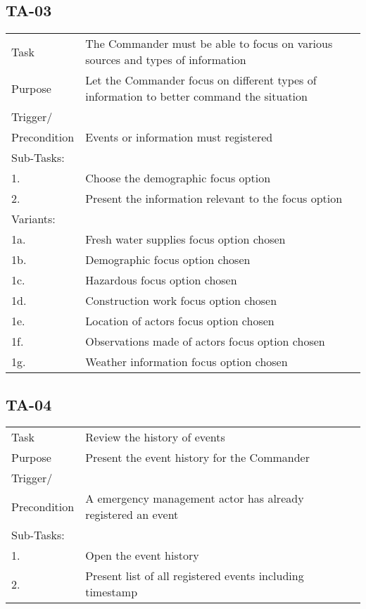 \FloatBarrier
\newpage

\subsection{TA-03}
\begin{longtable}{| p{2.5cm}  | p{10cm} |  }
	\hline
	Task & The Commander must be able to focus on various sources and types of information  \\
	Purpose & Let the Commander focus on different types of information to better command the situation \\
	Trigger/ &  \\ Precondition & Events or information must registered \\
	\hline
	Sub-Tasks: & \\
	1. & Choose the demographic focus option \\
	2. & Present the information relevant to the focus option \\
	\hline
	Variants: & \\
	1a. & Fresh water supplies focus option chosen \\
	1b. & Demographic focus option chosen \\
	1c. & Hazardous focus option chosen \\
	1d. & Construction work focus option chosen \\
	1e. & Location of actors focus option chosen \\
	1f. & Observations made of actors focus option chosen \\
	1g. & Weather information focus option chosen \\
	\hline
\end{longtable}

\subsection{TA-04}

\begin{longtable}{| p{2.5cm}  | p{10cm} |  }
	\hline
	Task & Review the history of events \\
	Purpose & Present the event history for the Commander \\
	Trigger/ &  \\ Precondition & A emergency management actor has already registered an event \\
	\hline
	Sub-Tasks: & \\
	1. & Open the event history \\
	2. & Present list of all registered events including timestamp  \\
	\hline
\end{longtable}

